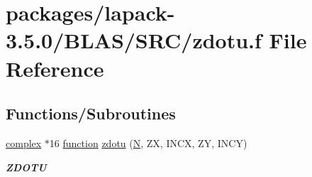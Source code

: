 \hypertarget{lapack-3_85_80_2BLAS_2SRC_2zdotu_8f}{}\section{packages/lapack-\/3.5.0/\+B\+L\+A\+S/\+S\+R\+C/zdotu.f File Reference}
\label{lapack-3_85_80_2BLAS_2SRC_2zdotu_8f}
\subsection*{Functions/\+Subroutines}
\begin{DoxyCompactItemize}
\item 
\hyperlink{structcomplex}{complex} $\ast$16 \hyperlink{afunc_8m_a7b5e596df91eadea6c537c0825e894a7}{function} \hyperlink{group__complex16__blas__level1_ga25e3992c589a478c5affcc975c6c7b08}{zdotu} (\hyperlink{polmisc_8c_a0240ac851181b84ac374872dc5434ee4}{N}, Z\+X, I\+N\+C\+X, Z\+Y, I\+N\+C\+Y)
\begin{DoxyCompactList}\small\item\em {\bfseries Z\+D\+O\+T\+U} \end{DoxyCompactList}\end{DoxyCompactItemize}

